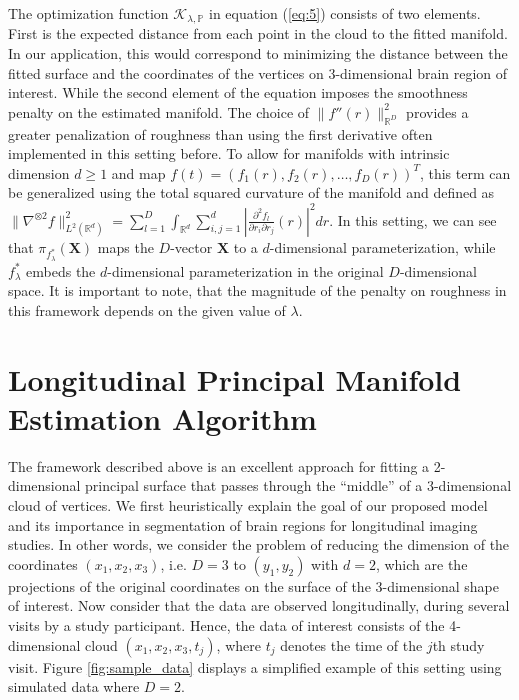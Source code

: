 \documentclass[11pt,reqno]{article}
\theoremstyle{definition}
\begin{document}
The optimization function $\mathcal{K}_{\lambda, \mathbb{P}}$ in equation (\ref{eq:5}) consists of two elements. First is the expected distance from each point in the cloud to the fitted manifold. In our application, this would correspond to minimizing the distance between the fitted surface and the coordinates of the vertices on 3-dimensional brain region of interest. While the second element of the equation imposes the smoothness penalty on the estimated manifold. The choice of $\|f''(r)\|_{\mathbb{R}^{D}}^2$ provides a greater penalization of roughness than using the first derivative often implemented in this setting before. To allow for manifolds with intrinsic dimension $d \geq 1$ and map $f(t) = \left(f_1(r), f_2(r), \dots, f_D(r)\right)^{T}$, this term can be generalized using the total squared curvature of the manifold and defined as $\|\nabla^{\otimes 2}f\|_{L^2(\mathbb{R}^{d})}^2 = \sum_{l=1}^{D} \int_{\mathbb{R}^{d}}\sum_{i, j = 1}^{d}\left|\frac{\partial^2f_l}{\partial r_i \partial r_j}(r)\right|^2dr$. In this setting, we can see that $\pi_{f_{\lambda}^{*}}(\boldsymbol{X})$ maps the $D$-vector $\boldsymbol{X}$ to a $d$-dimensional parameterization, while $f_{\lambda}^{*}$ embeds the $d$-dimensional parameterization in the original $D$-dimensional space. It is important to note, that the  magnitude of the penalty on roughness in this framework depends on the given value of $\lambda$.








\section{Longitudinal Principal Manifold Estimation Algorithm}\label{s:LPME}

The framework described above is an excellent approach for fitting a 2-dimensional principal surface that passes through the ``middle'' of a 3-dimensional cloud of vertices. We first heuristically explain the goal of our proposed model and its importance in segmentation of brain regions for longitudinal imaging studies. In other words, we consider the problem of reducing the dimension of the coordinates $(x_1, x_2, x_3)$, i.e. $D=3$ to $(y_1,y_2)$ with $d=2$, which are the projections of the original coordinates on the surface of the 3-dimensional shape of interest. Now consider that the data are observed longitudinally, during several visits by a study participant. Hence, the data of interest consists of the 4-dimensional cloud $(x_1, x_2, x_3,t_j)$, where $t_j$ denotes the time of the $j$th study visit. Figure \ref{fig:sample_data} displays a simplified example of this setting using simulated data where $D = 2$.
\end{document}
